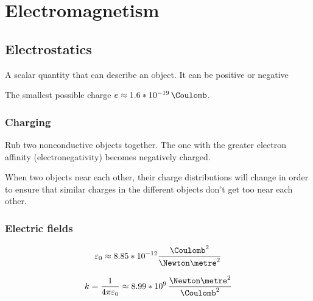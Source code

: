 \chapter{Electromagnetism}

\section{Electrostatics}

\begin{definition} A scalar quantity that can describe an object. It can be positive or negative
\end{definition}

\begin{definition} The smallest possible charge $e \approx 1.6 * 10^{-19} \, \Coulomb$.
\end{definition}

\subsection{Charging}

\begin{procedure} Rub two nonconductive objects together. The one with the greater electron affinity (electronegativity) becomes negatively charged.
\end{procedure}

\begin{procedure}[Polarization] When two objects near each other, their charge distributions will change in order to ensure that similar charges in the different objects don't get too near each other.
\end{procedure}


\subsection{Electric fields}

\begin{definition}
  \[
    \varepsilon_0 \approx 8.85 * 10^{-12} \frac{\Coulomb^2}{\Newton \metre^2}
  \]
\end{definition}

\begin{definition}
  \[
    k = \frac{1}{4\pi\varepsilon_0} \approx 8.99 * 10^9 \, \frac{\Newton \metre^2}{\Coulomb^2}
  \]
\end{definition}

